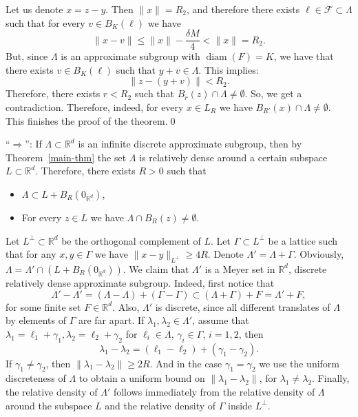 \documentclass[JEP,XML,SOM,Unicode,NoEqCountersInSection]{cedram}
\DeclareMathOperator{\diam}{diam}
\newcommand{\cF}{\mathcal{F}}
\newcommand{\bR}{\mathbb{R}}
\theoremstyle{plain}
\theoremstyle{definition}
\begin{document}
Let us denote $x = z-y$. Then $\| x \| = R_2$, and therefore there exists $\ell \in \cF \subset \Lambda$ such that for every $v \in B_K(\ell)$ we have
\[
\| x - v \| \le \| x \| - \frac{\delta M}{4} < \| x \|=R_2.
\]
But, since $\Lambda$ is an approximate subgroup with $\diam(F) = K$, we have that there exists $v \in B_K(\ell)$ such that $y + v \in \Lambda$. This implies:
\[
\| z- (y+v) \| < R_2.
\]
Therefore, there exists $r < R_2$ such that $B_{r}(z) \cap \Lambda \neq \emptyset$. So, we get a contradiction. Therefore, indeed, for every $x \in L_R$ we have $B_{R'}(x) \cap \Lambda \neq \emptyset$. This finishes the proof of the theorem.\qed


``$\Rightarrow$'': If $\Lambda \subset \bR^d$ is an infinite discrete approximate subgroup, then by Theorem~\ref{main-thm} the set $\Lambda$ is relatively dense around a certain subspace $L \subset \bR^d$. Therefore, there exists $R > 0$ such that
\begin{itemize}
\item $\Lambda \subset L + B_R(0_{\bR^d})$,
\item For every $z \in L$ we have $\Lambda \cap B_R(z) \neq \emptyset$.
\end{itemize}
Let $L^{\perp} \subset \bR^d$ be the orthogonal complement of $L$. Let $\Gamma \subset L^{\perp}$ be a lattice such that for any $x,y \in \Gamma$ we have $\| x - y \|_{L^{\perp}} \ge 4R$. Denote $\Lambda ' = \Lambda + \Gamma$. Obviously, $\Lambda = \Lambda' \cap (L+B_R(0_{\bR^d}))$. We claim that $\Lambda'$ is a Meyer set in $\bR^d$, \ie discrete relatively dense approximate subgroup. Indeed, first notice that
\[
\Lambda' - \Lambda' = (\Lambda - \Lambda) + (\Gamma - \Gamma) \subset (\Lambda + \Gamma) + F = \Lambda' + F,
\]
for some finite set $F \in \bR^d$. Also, $\Lambda'$ is discrete, since all different translates of $\Lambda$ by elements of $\Gamma$ are far apart. If $\lambda_1,\lambda_2 \in \Lambda'$, assume that $\lambda_1 = \ell_1+\gamma_1, \lambda_2 = \ell_2 + \gamma_2$ for $\ell_i \in \Lambda$, $\gamma_i \in \Gamma$, $i=1,2$, then
\[
\lambda_1 - \lambda_2 = (\ell_1-\ell_2) + (\gamma_1-\gamma_2).
\]
If $\gamma_1 \neq \gamma_2$, then $\| \lambda_1 - \lambda_2 \| \ge 2R$. And in the case $\gamma_1 = \gamma_2$ we use the uniform discreteness of $\Lambda$ to obtain a uniform bound on $\| \lambda_1 - \lambda_2 \|$, for $\lambda_1 \neq \lambda_2$. Finally, the relative density of $\Lambda'$ follows immediately from the relative density of $\Lambda$ around the subspace $L$ and the relative density of $\Gamma$ inside $L^{\perp}$.
\end{document}
